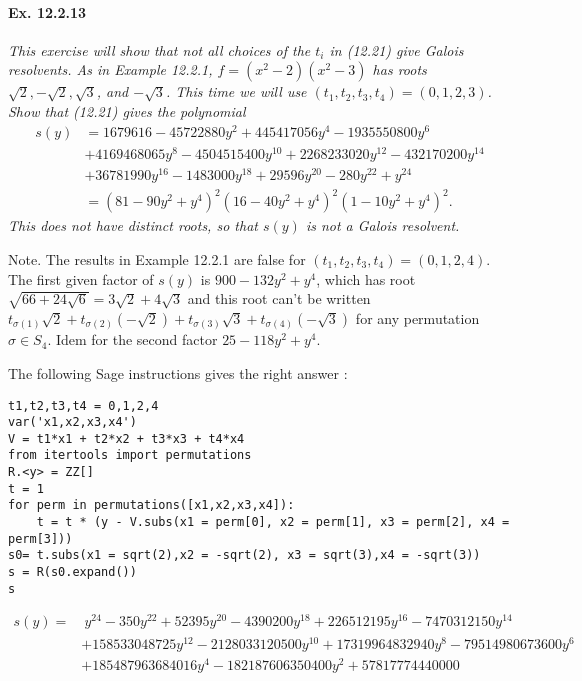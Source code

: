 \documentclass[11pt,a4paper]{article}
\begin{document}
\paragraph{Ex. 12.2.13}

{\it This exercise will show that not all choices of the $t_i$ in (12.21) give Galois resolvents. As in Example 12.2.1, $f = (x^2-2)(x^2-3)$ has roots $\sqrt{2},-\sqrt{2},\sqrt{3}$, and $-\sqrt{3}$. This time we will use $(t_1,t_2,t_3,t_4) = (0,1,2,3)$. Show that (12.21) gives the polynomial
\begin{align*}
s(y) &= 1679616 - 45722880y^2 + 445417056y^4-1935550800y^6\\
&+4169468065y^8-4504515400y^{10}+2268233020y^{12}-432170200y^{14}\\
&+36781990y^{16}-1483000y^{18}+29596y^{20} -280y^{22} + y^{24}\\
&=(81-90y^2+y^4)^2 (16-40y^2+y^4)^2(1-10y^2+y^4)^2.
\end{align*}
This does not have distinct roots, so that $s(y)$ is not a Galois resolvent.
}

\medskip

Note. The results in Example 12.2.1 are false for $(t_1,t_2,t_3,t_4) = (0,1,2,4)$. The first given factor of $s(y)$ is $900 -132 y^2 + y^4$, which  has root $\sqrt{66 + 24 \sqrt{6}} = 3\sqrt{2} + 4 \sqrt{3}$ and this root can't be written $t_{\sigma(1)}\sqrt{2} + t_{\sigma(2)}(-\sqrt{2}) + t_{\sigma(3)}\sqrt{3} + t_{\sigma(4)}(-\sqrt{3})$ for any permutation $\sigma \in S_4$. Idem for the second factor $25 - 118 y^2 + y^4$.

The following Sage instructions gives the right answer : 
\begin{verbatim}
t1,t2,t3,t4 = 0,1,2,4
var('x1,x2,x3,x4')
V = t1*x1 + t2*x2 + t3*x3 + t4*x4
from itertools import permutations
R.<y> = ZZ[]
t = 1
for perm in permutations([x1,x2,x3,x4]):
    t = t * (y - V.subs(x1 = perm[0], x2 = perm[1], x3 = perm[2], x4 = perm[3]))
s0= t.subs(x1 = sqrt(2),x2 = -sqrt(2), x3 = sqrt(3),x4 = -sqrt(3))
s = R(s0.expand())
s
\end{verbatim}
\begin{align*}
s(y) = & \ y^{24} - 350y^{22} + 52395y^{20} - 4390200y^{18} + 226512195y^{16} -7470312150y^{14}\\
 &+ 158533048725y^{12} - 2128033120500y^{10}+17319964832940y^{8} - 79514980673600y^{6}\\
  &+ 185487963684016y^{4} -182187606350400y^{2} + 57817774440000
\end{align*}
\end{document}
